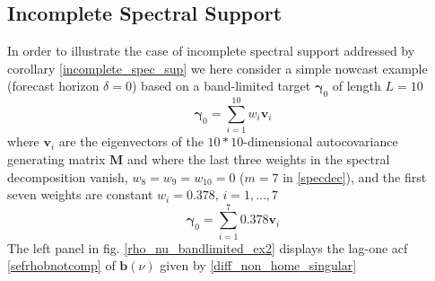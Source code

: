 \documentclass[a4paper]{article}
\begin{document}
\subsection{Incomplete Spectral Support}\label{incomplete_support}




In order to illustrate the case of incomplete spectral support addressed by corollary \ref{incomplete_spec_sup}  we here consider a simple nowcast example (forecast horizon $\delta=0$) based on a band-limited target $\boldsymbol{\gamma}_{0}$ of length $L=10$ 
\[
\boldsymbol{\gamma}_{0}=\sum_{i=1}^{10}w_i\mathbf{v}_i
\]
where $\mathbf{v}_i$ are the eigenvectors of the $10*10$-dimensional autocovariance generating matrix $\mathbf{M}$ and where the last three  weights in the spectral decomposition vanish, $w_{8}=w_9=w_{10}=0$ ($m=7$ in \ref{specdec}), and the first seven weights are constant $w_i=0.378$, $i=1,...,7$
\[
\boldsymbol{\gamma}_{0}=\sum_{i=1}^{7}0.378\mathbf{v}_i
\]
The left panel in fig. \ref{rho_nu_bandlimited_ex2} displays the lag-one acf \ref{sefrhobnotcomp} %
of $\mathbf{b}(\nu)$ %
given by \ref{diff_non_home_singular} %
\end{document}
